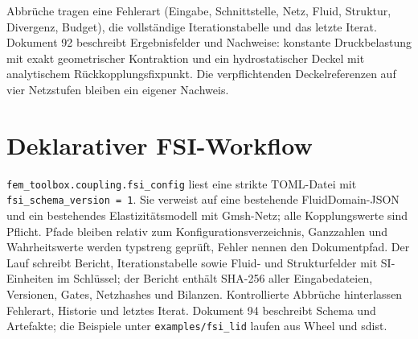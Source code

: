 Abbrüche tragen eine Fehlerart (Eingabe, Schnittstelle, Netz, Fluid,
Struktur, Divergenz, Budget), die vollständige Iterationstabelle und das
letzte Iterat. Dokument 92 beschreibt Ergebnisfelder und Nachweise:
konstante Druckbelastung mit exakt geometrischer Kontraktion und ein
hydrostatischer Deckel mit analytischem Rückkopplungsfixpunkt. Die
verpflichtenden Deckelreferenzen auf vier Netzstufen bleiben ein eigener Nachweis.

\section{Deklarativer FSI-Workflow}
\texttt{fem\_toolbox.coupling.fsi\_config} liest eine strikte TOML-Datei mit
\texttt{fsi\_schema\_version = 1}. Sie verweist auf eine bestehende
FluidDomain-JSON und ein bestehendes Elastizitätsmodell mit Gmsh-Netz; alle
Kopplungswerte sind Pflicht. Pfade bleiben relativ zum Konfigurationsverzeichnis,
Ganzzahlen und Wahrheitswerte werden typstreng geprüft, Fehler nennen den
Dokumentpfad. Der Lauf schreibt Bericht, Iterationstabelle sowie Fluid- und
Strukturfelder mit SI-Einheiten im Schlüssel; der Bericht enthält
SHA-256 aller Eingabedateien, Versionen, Gates, Netzhashes und Bilanzen.
Kontrollierte Abbrüche hinterlassen Fehlerart, Historie und letztes Iterat.
Dokument 94 beschreibt Schema und Artefakte; die Beispiele unter
\texttt{examples/fsi\_lid} laufen aus Wheel und sdist.
